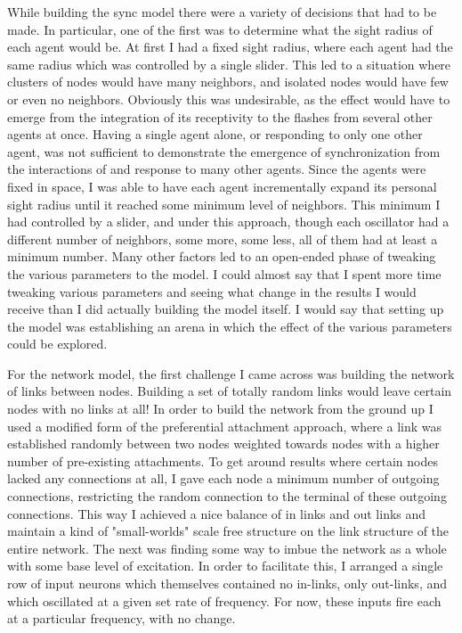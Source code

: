 \documentclass[12pt]{article}
\begin{document}
While building the sync model there were a variety of decisions that had to be made.  In particular, one of the first was to determine what the sight radius of each agent would be.  At first I had a fixed sight radius, where each agent had the same radius which was controlled by a single slider.  This led to a situation where clusters of nodes would have many neighbors, and isolated nodes would have few or even no neighbors.  Obviously this was undesirable, as the effect would have to emerge from the integration of its receptivity to the flashes from several other agents at once.  Having a single agent alone, or responding to only one other agent, was not sufficient to demonstrate the emergence of synchronization from the interactions of and response to many other agents.  Since the agents were fixed in space, I was able to have each agent incrementally expand its personal sight radius until it reached some minimum level of neighbors.  This minimum I had controlled by a slider, and under this approach, though each oscillator had a different number of neighbors, some more, some less, all of them had at least a minimum number.  Many other factors led to an open-ended phase of tweaking the various parameters to the model.  I could almost say that I spent more time tweaking various parameters and seeing what change in the results I would receive than I did actually building the model itself.  I would say that setting up the model was establishing an arena in which the effect of the various parameters could be explored.  

For the network model, the first challenge I came across was building the network of links between nodes.  Building a set of totally random links would leave certain nodes with no links at all!  In order to build the network from the ground up I used a modified form of the preferential attachment approach, where a link was established randomly between two nodes weighted towards nodes with a higher number of pre-existing attachments.  To get around results where certain nodes lacked any connections at all, I gave each node a minimum number of outgoing connections, restricting the random connection to the terminal of these outgoing connections.  This way I achieved a nice balance of in links and out links and maintain a kind of "small-worlds" scale free structure on the link structure of the entire network.  The next was finding some way to imbue the network as a whole with some base level of excitation.  In order to facilitate this, I arranged a single row of input neurons which themselves contained no in-links, only out-links, and which oscillated at a given set rate of frequency.  For now, these inputs fire each at a particular frequency, with no change.  
\end{document}

